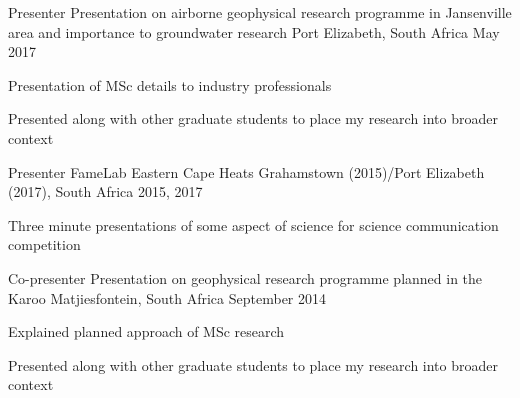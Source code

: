 


\begin{cventries}


\cventry
{Presenter}
{Presentation on airborne geophysical research programme in Jansenville area and importance to groundwater research} %
{Port Elizabeth, South Africa} %
{May 2017} %
{ %
\begin{cvitems}
\item {Presentation of MSc details to industry professionals}
\item {Presented along with other graduate students to place my research into broader context}
\end{cvitems}
}


\cventry
{Presenter}
{FameLab Eastern Cape Heats} %
{Grahamstown (2015)/Port Elizabeth (2017), South Africa} %
{2015, 2017} %
{ %
\begin{cvitems}
\item {Three minute presentations of some aspect of science for science communication competition}
\end{cvitems}
}


\cventry
{Co-presenter}
{Presentation on geophysical research programme planned in the Karoo} %
{Matjiesfontein, South Africa} %
{September 2014} %
{ %
\begin{cvitems}
\item {Explained planned approach of MSc research}
\item {Presented along with other graduate students to place my research into broader context}
\end{cvitems}
}



\end{cventries}
